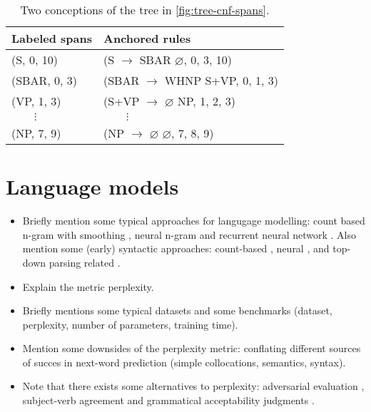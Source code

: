 \begin{table}[]
  \center
  \small
  \bgroup  %
  \def\arraystretch{1.5}  %
  \begin{tabular}{l|l}
    Labeled spans & Anchored rules \\
    \hline
    (S, 0, 10)     & (S $\to$ SBAR $\varnothing$, 0, 3, 10)  \\
    (SBAR, 0, 3)   & (SBAR $\to$ WHNP S+VP, 0, 1, 3)  \\
    (VP, 1, 3)     & (S+VP $\to$ $\varnothing$ NP, 1, 2, 3)  \\
    $\qquad\vdots$ & $\qquad\vdots$  \\
    (NP, 7, 9)     & (NP $\to$ $\varnothing$ $\varnothing$, 7, 8, 9)  \\
  \end{tabular}
  \caption{Two conceptions of the tree in \ref{fig:tree-cnf-spans}.}
  \label{tab:spans-rules}
  \egroup  %
\end{table}


\section{Language models}
\begin{itemize}
  \item Briefly mention some typical approaches for langugage modelling: count based n-gram with smoothing \citep{chen1999empirical,kneser1995improved}, neural n-gram \citep{bengio2003neural} and recurrent neural network \citep{mikolov2010recurrent}. Also mention some (early) syntactic approaches: count-based \citep{chelba2000structured,pauls2012treelets}, neural \citep{emami2005neural}, and top-down parsing related \citep{Roark2001}.
  \item Explain the metric perplexity.
  \item Briefly mentions some typical datasets and some benchmarks (dataset, perplexity, number of parameters, training time).
  \item Mention some downsides of the perplexity metric: conflating different sources of succes in next-word prediction (simple collocations, semantics, syntax).
  \item Note that there exists some alternatives to perplexity: adversarial evaluation \citep{Smith2012:adversarial}, subject-verb agreement \citep{Linzen+2016:LSTM-syntax} and grammatical acceptability judgments \citep{Linzen+2018:targeted}.
\end{itemize}


